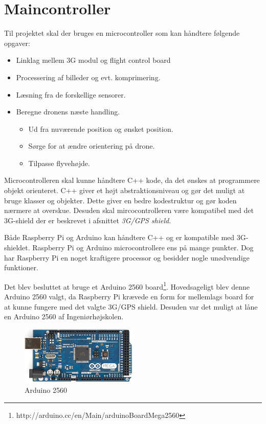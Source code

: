 \section{Maincontroller}

Til projektet skal der bruges en microcontroller som kan håndtere følgende opgaver:  
\begin{itemize}
	\item Linklag mellem 3G modul og flight control board
	\item Processering af billeder og evt. komprimering.
	\item Læsning fra de forskellige sensorer.
	\item Beregne dronens næste handling. 
	\begin{itemize}
		\item Ud fra nuværende position og ønsket position.
		\item Sørge for at ændre orientering på drone. 
		\item Tilpasse flyvehøjde.
	\end{itemize}
\end{itemize}

\vspace{0.5cm}

Microcontrolleren skal kunne håndtere C++ kode, da det ønskes at programmere objekt orienteret. C++ giver et højt abstraktionsniveau og gør det muligt at bruge klasser og objekter. Dette giver en bedre kodestruktur og gør koden nærmere at overskue. Desuden skal mircocontrolleren være kompatibel med det 3G-shield der er beskrevet i afsnittet \textit{3G/GPS shield}. 

Både Raspberry Pi og Arduino kan håndtere C++ og er kompatible med 3G-shieldet. Raspberry Pi og Arduino microcontrollere ens på mange punkter. Dog har Raspberry Pi en noget kraftigere processor og besidder nogle unødvendige funktioner. 

Det blev besluttet at bruge et Arduino 2560 board\footnote{http://arduino.cc/en/Main/arduinoBoardMega2560}. Hovedsageligt blev denne Arduino 2560 valgt, da Raspberry Pi krævede en form for mellemlags board for at kunne fungere med det valgte 3G/GPS shield. Desuden var det muligt at låne en Arduino 2560 af Ingeniørhøjskolen. 

\vspace{0.5cm}

\begin{figure}[H]
\centering
\includegraphics[width=0.5\textwidth]{Billeder/ArduinoMega2560.png}
\caption{Arduino 2560}
\label{fig:Arduino_2560}
\end{figure}


